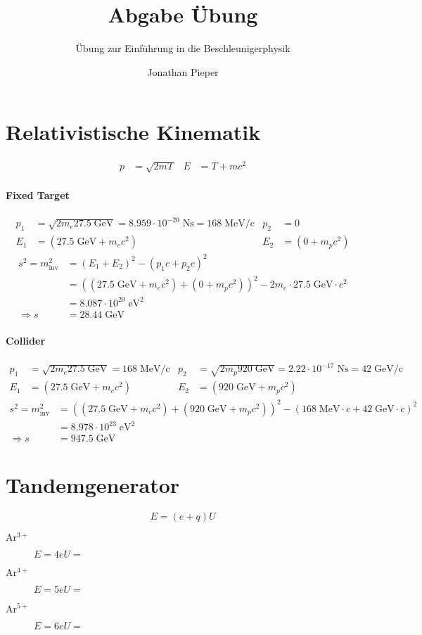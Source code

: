 \documentclass[12pt,DIV=15,a4paper,twoside,draft=false]{scrartcl}
\author{Jonathan Pieper}
\title{Abgabe Übung \blatt{}}
\subtitle{Übung zur Einführung in die Beschleunigerphysik}
\newcommand{\blatt}{2}
\begin{document}
\maketitle
\titlelabel{Aufgabe \blatt{}.\thesection{} }

\section{Relativistische Kinematik}
\begin{align*}
p &= \sqrt{2mT} &
E &= T + mc^2
\end{align*}
\paragraph{Fixed Target}
\begin{align*}
p_1 &= \sqrt{2 m_e 27.5\;\mathrm{GeV}} = 
8.959\cdot 10^{-20}\;\mathrm{Ns} = 168\;\mathrm{MeV/c} & 
p_2 &= 0\\
E_1 &= (27.5\;\mathrm{GeV} + m_e c^2) & 
E_2 &= (0 + m_p c^2)
\end{align*}
\begin{align*}
s^2 = m_{\mathrm{inv}}^2 &=
 (E_1 + E_2)^2 - (p_1c + p_2c)^2\\
  &=  ((27.5\;\mathrm{GeV} + m_e c^2) + (0+ m_p c^2))^2 - 2 m_e \cdot 27.5\;\mathrm{GeV} \cdot c^2\\
&= 8.087\cdot 10^{20}\;\mathrm{eV}^2 \\
⇒ s &= 28.44\;\mathrm{GeV}
\end{align*}
\paragraph{Collider}
\begin{align*}
p_1 &= \sqrt{2 m_e 27.5\;\mathrm{GeV}} = 168\;\mathrm{MeV/c}& 
p_2 &= \sqrt{2 m_p 920\;\mathrm{GeV}} = 2.22\cdot 10^{-17}\;\mathrm{Ns} = 42\;\mathrm{GeV/c}\\
E_1 &= (27.5\;\mathrm{GeV} + m_e c^2) & 
E_2 &= (920\;\mathrm{GeV} + m_p c^2)
\end{align*}
\begin{align*}
s^2 = m_{\mathrm{inv}}^2 &=
 ((27.5\;\mathrm{GeV} + m_e c^2) + (920\;\mathrm{GeV} + m_p c^2))^2 - 
(168\;\mathrm{MeV}\cdot c + 42\;\mathrm{GeV}\cdot c)^2\\
&= 8.978\cdot 10^{23}\;\mathrm{eV}^2\\
⇒ s &= 947.5 \;\mathrm{GeV}
\end{align*}

\section{Tandemgenerator}
$$ E = (e+q) U $$
\begin{description}
\item[$\mathrm{Ar^{3+}}$] $ E = 4 e U = $
\item[$\mathrm{Ar^{4+}}$] $ E = 5 e U = $
\item[$\mathrm{Ar^{5+}}$] $ E = 6 e U = $
\end{description}
\end{document}
